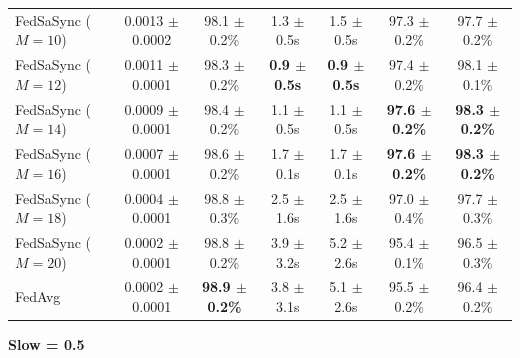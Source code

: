 \begin{table}[t]
{\begin{tabular}{lcccccc}
FedSaSync ($M = 10$) & 0.0013 $\pm$ 0.0002 & 98.1 $\pm$ 0.2\% & 1.3 $\pm$ 0.5s & 1.5 $\pm$ 0.5s & 97.3 $\pm$ 0.2\% & 97.7 $\pm$ 0.2\% \\
FedSaSync ($M = 12$) & 0.0011 $\pm$ 0.0001 & 98.3 $\pm$ 0.2\% & \textbf{0.9 $\pm$ 0.5s} & \textbf{0.9 $\pm$ 0.5s} & 97.4 $\pm$ 0.2\% & 98.1 $\pm$ 0.1\% \\
FedSaSync ($M = 14$) & 0.0009 $\pm$ 0.0001 & 98.4 $\pm$ 0.2\% & 1.1 $\pm$ 0.5s & 1.1 $\pm$ 0.5s & \textbf{97.6 $\pm$ 0.2\%} & \textbf{98.3 $\pm$ 0.2\%} \\
FedSaSync ($M = 16$) & 0.0007 $\pm$ 0.0001 & 98.6 $\pm$ 0.2\% & 1.7 $\pm$ 0.1s & 1.7 $\pm$ 0.1s & \textbf{97.6 $\pm$ 0.2\%} & \textbf{98.3 $\pm$ 0.2\%} \\
FedSaSync ($M = 18$) & 0.0004 $\pm$ 0.0001 & 98.8 $\pm$ 0.3\% & 2.5 $\pm$ 1.6s & 2.5 $\pm$ 1.6s & 97.0 $\pm$ 0.4\% & 97.7 $\pm$ 0.3\% \\
FedSaSync ($M = 20$) & 0.0002 $\pm$ 0.0001 & 98.8 $\pm$ 0.2\% & 3.9 $\pm$ 3.2s & 5.2 $\pm$ 2.6s & 95.4 $\pm$ 0.1\% & 96.5 $\pm$ 0.3\% \\
FedAvg & 0.0002 $\pm$ 0.0001 & \textbf{98.9 $\pm$ 0.2\%} & 3.8 $\pm$ 3.1s & 5.1 $\pm$ 2.6s & 95.5 $\pm$ 0.2\% & 96.4 $\pm$ 0.2\% \\
\hline
\end{tabular}%
}
\par\vspace{0.8em}
\noindent\textbf{Slow = 0.5} \\[0.2em]
\end{table}
